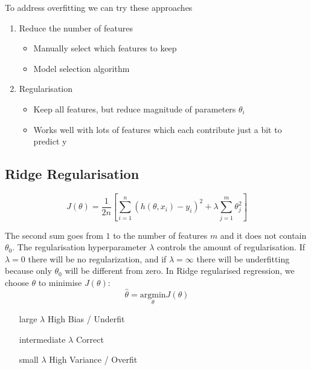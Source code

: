 \documentclass[11pt]{article}
\begin{document}
To address overfitting we can try these approaches
\begin{enumerate}
    \item Reduce the number of features
          \begin{itemize}
              \item Manually select which features to keep
              \item Model selection algorithm
          \end{itemize}
    \item Regularisation
          \begin{itemize}
              \item Keep all features, but reduce magnitude of parameters $\theta_i$
              \item Works well with lots of features which each contribute just a bit to predict y
          \end{itemize}
\end{enumerate}

\subsection{Ridge Regularisation}
\begin{equation}
    J(\theta) = \frac{1}{2n}\left[\sum_{i=1}^{n}(h(\theta,x_i)-y_i)^2 + \lambda \sum_{j=1}^{m}\theta_j^2\right]
\end{equation}

The second sum goes from $1$ to the number of features $m$ and it does not contain $\theta_0$. The regularisation hyperparameter $\lambda$ controls the amount of regularisation. If $\lambda = 0$ there will be no regularization, and if $\lambda = \infty$ there will be underfitting because only $\theta_0$ will be different from zero.
In Ridge regularised regression, we choose $\theta$ to minimise $J(\theta)$:
\begin{equation}
    \hat{\theta} = \underset{\theta}{\text{argmin}} J(\theta)
\end{equation}

\begin{itemize}[leftmargin=*, labelindent=3cm, labelsep=1cm]
    \item[large $\lambda$] High Bias / Underfit
    \item[intermediate $\lambda$] Correct
    \item[small $\lambda$] High Variance / Overfit
\end{itemize}
\end{document}

